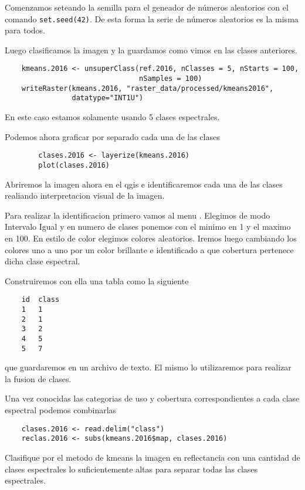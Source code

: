 \begin{exa}
    Comenzamos seteando la semilla para el geneador de n\'umeros aleatorios con el
    comando \texttt{set.seed(42)}. De esta forma la serie de n\'umeros aleatorios
    es la misma para todos.

    Luego clasificamos la imagen y la guardamos como vimos en las clases anteriores.
    \begin{lstlisting}
    kmeans.2016 <- unsuperClass(ref.2016, nClasses = 5, nStarts = 100,
                                nSamples = 100)
    writeRaster(kmeans.2016, "raster_data/processed/kmeans2016",
                datatype="INT1U")
    \end{lstlisting}

    En este caso estamos solamente usando 5 clases espectrales.

    Podemos ahora graficar por separado cada una de las clases
    \begin{lstlisting}
        clases.2016 <- layerize(kmeans.2016)
        plot(clases.2016)
    \end{lstlisting}

    Abriremos la imagen ahora en el qgis e identificaremos cada una de las clases
    realiando interpretacion visual de la imagen.

    Para realizar la identificacion primero vamos al menu . Elegimos de modo
    Intervalo Igual y en numero de clases ponemos con el minimo en 1 y el maximo en
    100. En estilo de color elegimos colores aleatorios. Iremos luego cambiando los
    colores uno a uno por un color brillante e identificado a que cobertura
    pertenece dicha clase espectral.

    Construiremos con ella una tabla como la siguiente

\begin{verbatim}
    id  class
    1   1
    2   1
    3   2
    4   5
    5   7
\end{verbatim}

que guardaremos en un archivo de texto. El mismo lo utilizaremos para realizar
la fusion de clases.

Una vez conocidas las categorias de uso y cobertura correspondientes a cada
clase espectral podemos combinarlas

\begin{lstlisting}
    clases.2016 <- read.delim("class")
    reclas.2016 <- subs(kmeans.2016$map, clases.2016)
\end{lstlisting}

\end{exa}
\begin{act}
    Clasifique por el metodo de kmeans la imagen en reflectancia con una
    cantidad de clases espectrales lo suficientemente altas para separar todas
    las clases espectrales.
\end{act}

